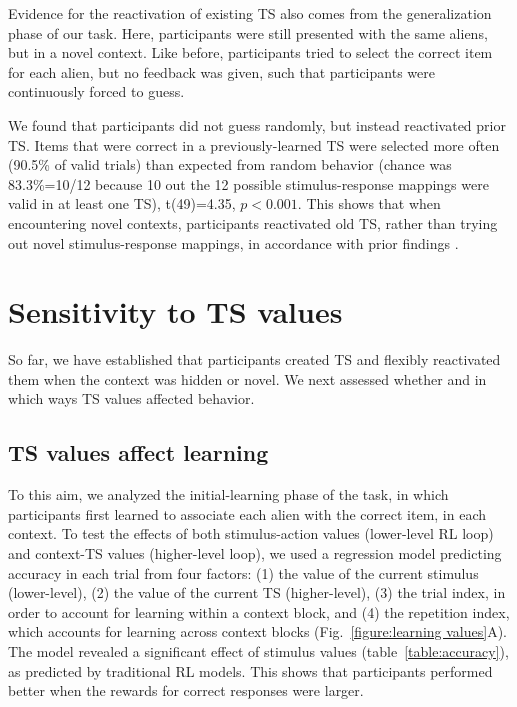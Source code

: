 \documentclass[10pt, letterpaper]{article}
\begin{document}
Evidence for the reactivation of existing TS also comes from the generalization phase of our task. Here, participants were still presented with the same aliens, but in a novel context. Like before, participants tried to select the correct item for each alien, but no feedback was given, such that participants were continuously forced to guess.

We found that participants did not guess randomly, but instead reactivated prior TS. Items that were correct in a previously-learned TS were selected more often (90.5\% of valid trials) than expected from random behavior (chance was 83.3\%=10/12 because 10 out the 12 possible stimulus-response mappings were valid in at least one TS), t(49)=4.35, $p<0.001$. This shows that when encountering novel contexts, participants reactivated old TS, rather than trying out novel stimulus-response mappings, in accordance with prior findings \cite{collins_cognitive_2013}.


\section{Sensitivity to TS values}

So far, we have established that participants created TS and flexibly reactivated them when the context was hidden or novel. We next assessed whether and in which ways TS values affected behavior.


\subsection{TS values affect learning}

To this aim, we analyzed the initial-learning phase of the task, in which participants first learned to associate each alien with the correct item, in each context. To test the effects of both stimulus-action values (lower-level RL loop) and context-TS values (higher-level loop), we used a regression model predicting accuracy in each trial from four factors: (1) the value of the current stimulus (lower-level), (2) the value of the current TS (higher-level), (3) the trial index, in order to account for learning within a context block, and (4) the repetition index, which accounts for learning across context blocks (Fig.~\ref{figure:learning values}A). The model revealed a significant effect of stimulus values (table~\ref{table:accuracy}), as predicted by traditional RL models. This shows that participants performed better when the rewards for correct responses were larger.
\end{document}

